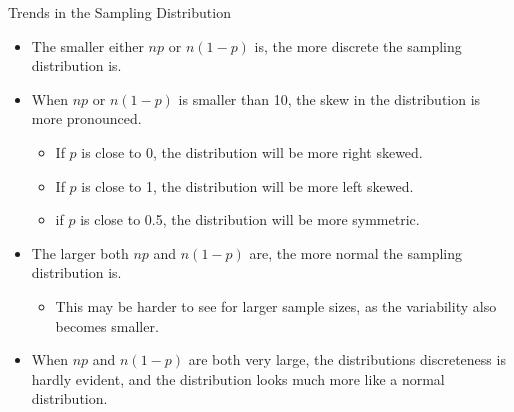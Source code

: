\documentclass{beamer}
\begin{document}
\begin{frame}
  \begin{block}{Trends in the Sampling Distribution}
    \begin{itemize}
    \item The smaller either $np$ or $n(1-p)$ is, the more discrete the sampling distribution is.\pause
    \item When $np$ or $n(1-p)$ is smaller than 10, the skew in the distribution is more pronounced.\pause
      \begin{itemize}
      \item If $p$ is close to 0, the distribution will be more right skewed.\pause
      \item If $p$ is close to 1, the distribution will be more left skewed.\pause
      \item if $p$ is close to 0.5, the distribution will be more symmetric.\pause
      \end{itemize}
    \item The larger both $np$ and $n(1-p)$ are, the more normal the sampling distribution is.\pause
      \begin{itemize}
      \item This may be harder to see for larger sample sizes, as the variability also becomes smaller.\pause
      \end{itemize}
    \item When $np$ and $n(1-p)$ are both very large, the distributions discreteness is hardly evident, and the distribution looks much more like a normal distribution.
    \end{itemize}
  \end{block}
\end{frame}
\end{document}
